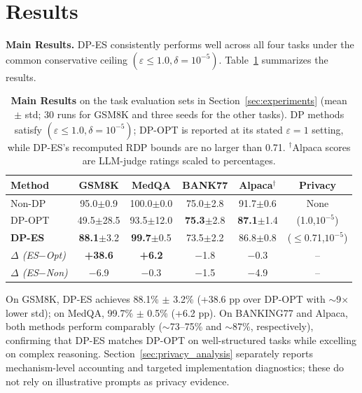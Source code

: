 \section{Results}
\label{sec:results}

\noindent\textbf{Main Results.}
DP-ES consistently performs well across all four tasks under the common conservative ceiling $(\varepsilon{\leq}1.0,\delta{=}10^{-5})$. Table~\ref{tab:main_results_full} summarizes the results.


\begin{table}[H]
\centering
\scriptsize
\setlength{\tabcolsep}{1.5pt}
\begin{tabular}{lccccc}
\toprule
\textbf{Method} & \textbf{GSM8K} & \textbf{MedQA} & \textbf{BANK77} & \textbf{Alpaca$^\dagger$} & \textbf{Privacy} \\
\midrule
Non-DP & 95.0{\scriptsize$\pm$0.9} & 100.0{\scriptsize$\pm$0.0} & 75.0{\scriptsize$\pm$2.8} & 91.7{\scriptsize$\pm$0.6} & None \\
\midrule
DP-OPT & 49.5{\scriptsize$\pm$28.5} & 93.5{\scriptsize$\pm$12.0} & \textbf{75.3}{\scriptsize$\pm$2.8} & \textbf{87.1}{\scriptsize$\pm$1.4} & (1.0,$10^{-5}$) \\
\textbf{DP-ES} & \textbf{88.1}{\scriptsize$\pm$3.2} & \textbf{99.7}{\scriptsize$\pm$0.5} & 73.5{\scriptsize$\pm$2.2} & 86.8{\scriptsize$\pm$0.8} & ($\leq$0.71,$10^{-5}$) \\
\midrule
\textit{$\Delta$ (ES$-$Opt)} & \textbf{+38.6} & \textbf{+6.2} & $-$1.8 & $-$0.3 & -- \\
\textit{$\Delta$ (ES$-$Non)} & $-$6.9 & $-$0.3 & $-$1.5 & $-$4.9 & -- \\
\bottomrule
\end{tabular}
\caption{\textbf{Main Results} on the task evaluation sets in Section~\ref{sec:experiments} (mean $\pm$ std; 30 runs for GSM8K and three seeds for the other tasks). DP methods satisfy $(\varepsilon{\leq}1.0,\delta{=}10^{-5})$; DP-OPT is reported at its stated $\varepsilon=1$ setting, while DP-ES's recomputed RDP bounds are no larger than 0.71. $^\dagger$Alpaca scores are LLM-judge ratings scaled to percentages.}
\label{tab:main_results_full}
\end{table}
\vspace{-0.8em}

\noindent On GSM8K, DP-ES achieves 88.1\% $\pm$ 3.2\% (+38.6 pp over DP-OPT with $\sim$9$\times$ lower std); on MedQA, 99.7\% $\pm$ 0.5\% (+6.2 pp). On BANKING77 and Alpaca, both methods perform comparably ($\sim$73--75\% and $\sim$87\%, respectively), confirming that DP-ES matches DP-OPT on well-structured tasks while excelling on complex reasoning. Section~\ref{sec:privacy_analysis} separately reports mechanism-level accounting and targeted implementation diagnostics; these do not rely on illustrative prompts as privacy evidence.

